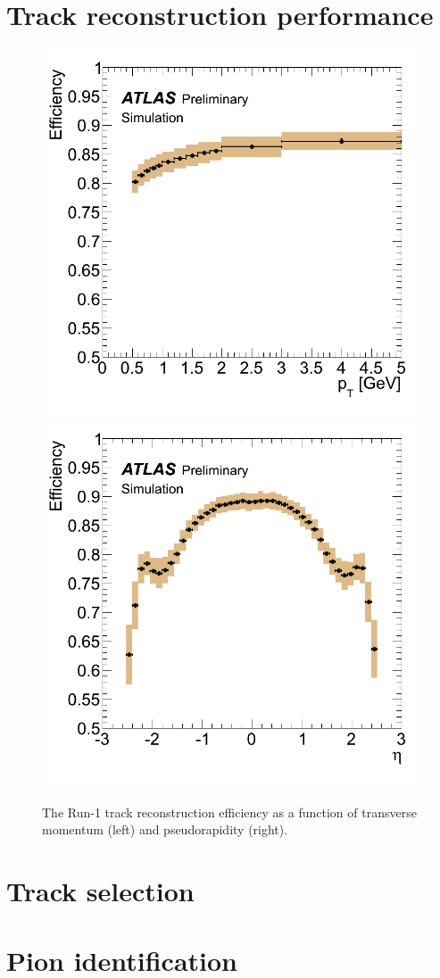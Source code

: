 \section{Track reconstruction performance}

\begin{figure}[t]
  \includegraphics[width=0.49\linewidth]{atl_com_phys_2012_1541_fig_07_eff_pt.png}
  \includegraphics[width=0.49\linewidth]{atl_com_phys_2012_1541_fig_08_eff_eta.png}
  \caption{The Run-1 track reconstruction efficiency as a function of transverse momentum (left) and pseudorapidity (right).}
  \label{fig:trk_eff}
\end{figure}

\section{Track selection} %

\section{Pion identification}


